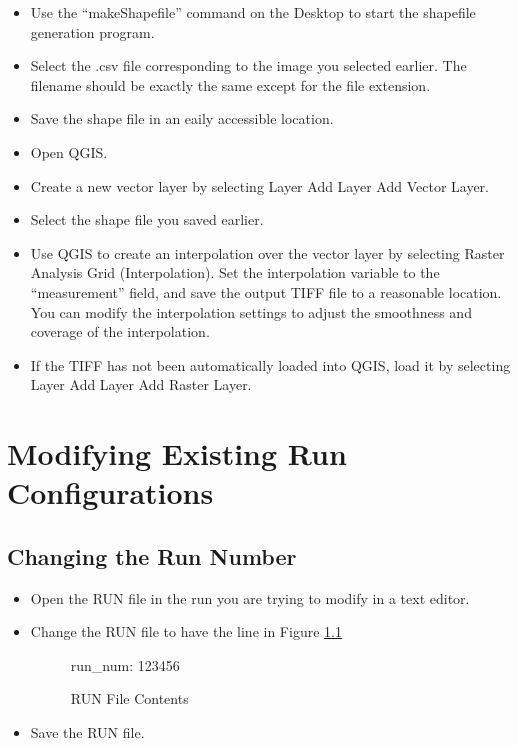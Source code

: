 \documentclass{report}
\begin{document}
\begin{itemize}
\begin{figure}[ht]
			\end{figure}
		\item Use the ``makeShapefile'' command on the Desktop to start the shapefile generation program.
		\item Select the .csv file corresponding to the image you selected earlier.  The filename should be exactly the same except for the file extension.
		\item Save the shape file in an eaily accessible location.
		\item Open QGIS.
		\item Create a new vector layer by selecting Layer \textrightarrow Add Layer \textrightarrow Add Vector Layer.
		\item Select the shape file you saved earlier.
		\item Use QGIS to create an interpolation over the vector layer by selecting Raster \textrightarrow Analysis \textrightarrow Grid (Interpolation).  Set the interpolation variable to the ``measurement'' field, and save the output TIFF file to a reasonable location.  You can modify the interpolation settings to adjust the smoothness and coverage of the interpolation.
		\item If the TIFF has not been automatically loaded into QGIS, load it by selecting Layer \textrightarrow Add Layer \textrightarrow Add Raster Layer.
	\end{itemize}
\chapter{Modifying Existing Run Configurations}
	\section{Changing the Run Number}
		\begin{itemize}
			\item Open the RUN file in the run you are trying to modify in a text editor.
			\item Change the RUN file to have the line in Figure \ref{lst:RUN_file}
				\begin{figure}[ht]
					\centering
					\caption{RUN File Contents}
					\label{lst:RUN_file}
					\begin{listing}{1}
run_num: 123456\end{listing}
				\end{figure}
			\item Save the RUN file.
		\end{itemize}
\end{document}
